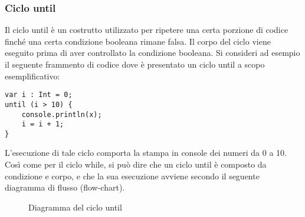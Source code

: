 \subsubsection{Ciclo until}
Il ciclo until è un costrutto utilizzato per ripetere una certa porzione di codice finché una certa condizione booleana rimane falsa. Il corpo del 
ciclo viene eseguito prima di aver controllato la condizione booleana. Si consideri ad esempio il seguente frammento di codice dove è presentato un ciclo 
until a scopo esemplificativo:

\vspace{0.5cm}

\begin{lstlisting}[frame=single]
var i : Int = 0;
until (i > 10) {
    console.println(x);
    i = i + 1;
}
\end{lstlisting}

\vspace{0.5cm}

L’esecuzione di tale ciclo comporta la stampa in console dei numeri da 0 a 10. Così come per il ciclo while, si può dire che un ciclo until è 
composto da condizione e corpo, e che la sua esecuzione avviene secondo il seguente diagramma di flusso (flow-chart).

\vspace{0.5cm}

\begin{figure}[h]
    \centering
    \caption{Diagramma del ciclo until}
    \label{fig:flowchart2}
\end{figure}